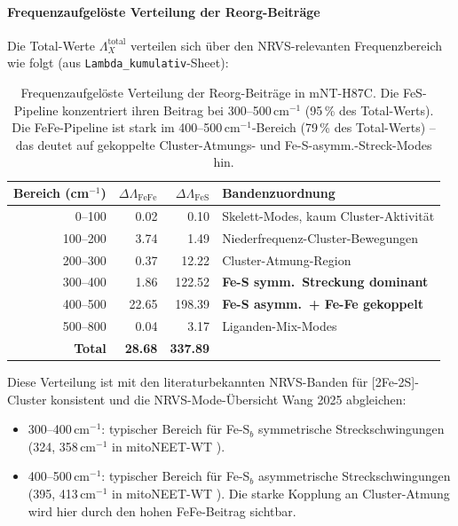 \documentclass[11pt,a4paper,twoside]{article}
\theoremstyle{remark}
\begin{document}
\paragraph{Frequenzaufgel\"oste Verteilung der Reorg-Beitr\"age}

Die Total-Werte $\Lambda_X^\text{total}$ verteilen sich \"uber den
NRVS-relevanten Frequenzbereich wie folgt
(aus \texttt{Lambda\_kumulativ}-Sheet):

\begin{table}[h]
\centering
\small
\begin{tabular}{|r|r|r|l|}
\hline
\textbf{Bereich (cm$^{-1}$)} & $\Delta\Lambda_\text{FeFe}$ &
  $\Delta\Lambda_\text{FeS}$ & \textbf{Bandenzuordnung} \\
\hline
0--100   & 0.02   & 0.10    & Skelett-Modes, kaum Cluster-Aktivit\"at \\
100--200 & 3.74   & 1.49    & Niederfrequenz-Cluster-Bewegungen \\
200--300 & 0.37   & 12.22   & Cluster-Atmung-Region \\
300--400 & 1.86   & 122.52  & \textbf{Fe-S symm.\ Streckung dominant} \\
400--500 & 22.65  & 198.39  & \textbf{Fe-S asymm.\ + Fe-Fe gekoppelt} \\
500--800 & 0.04   & 3.17    & Liganden-Mix-Modes \\
\hline
\textbf{Total} & \textbf{28.68} & \textbf{337.89} & \\
\hline
\end{tabular}
\caption{Frequenzaufgel\"oste Verteilung der Reorg-Beitr\"age in
mNT-H87C. Die FeS-Pipeline konzentriert ihren Beitrag bei
300--500\,cm$^{-1}$ (95\,\% des Total-Werts). Die FeFe-Pipeline
ist stark im 400--500\,cm$^{-1}$-Bereich (79\,\% des Total-Werts) --
das deutet auf gekoppelte Cluster-Atmungs- und Fe-S-asymm.-Streck-Modes
hin.}
\label{tab:val-mNT-frequenz}
\end{table}

Diese Verteilung ist mit den literaturbekannten NRVS-Banden f\"ur
[2Fe-2S]-Cluster konsistent
\cite{Gee2021} und die NRVS-Mode-\"Ubersicht Wang 2025 \cite{Wang2025} abgleichen:
\begin{itemize}\setlength{\itemsep}{0pt}
  \item 300--400\,cm$^{-1}$: typischer Bereich f\"ur Fe-S$_b$
        symmetrische Streckschwingungen (324, 358\,cm$^{-1}$ in
        mitoNEET-WT \cite{Gee2021}).
  \item 400--500\,cm$^{-1}$: typischer Bereich f\"ur Fe-S$_b$
        asymmetrische Streckschwingungen (395, 413\,cm$^{-1}$
        in mitoNEET-WT \cite{Gee2021}). Die starke Kopplung an
        Cluster-Atmung wird hier durch den hohen FeFe-Beitrag
        sichtbar.
\end{itemize}
\end{document}
